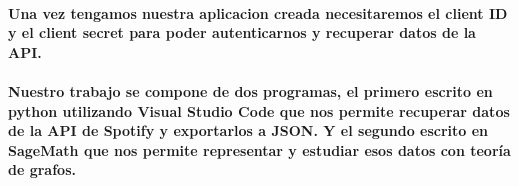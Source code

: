 \documentclass[11pt,spanish]{article}
\begin{document}
\paragraph*{Una vez tengamos nuestra aplicacion creada necesitaremos el client ID y el client secret para poder autenticarnos 
y recuperar datos de la API.}

\paragraph*{Nuestro trabajo se compone de dos programas, el primero escrito en python utilizando Visual Studio Code
que nos permite recuperar datos de la API de Spotify y exportarlos a JSON. 
Y el segundo escrito en SageMath que nos permite representar y estudiar esos datos con teoría de grafos.}
\end{document}
